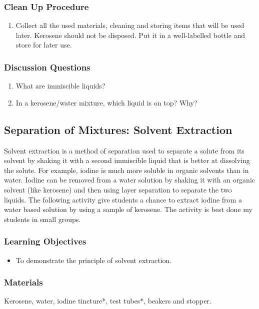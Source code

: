 \subsubsection*{Clean Up Procedure}
\begin{enumerate}
\item{Collect all the used materials, cleaning and storing items that will be used later. Kerosene should not be disposed. Put it in a well-labelled bottle and store for later use.}
\end{enumerate}

\subsubsection*{Discussion Questions}
\begin{enumerate}
\item{What are immiscible liquids?}
\item{In a kerosene/water mixture, which liquid is on top? Why?}
\end{enumerate}

\subsection{Separation of Mixtures: Solvent Extraction}

Solvent extraction is a method of separation used to separate a solute from its solvent by shaking it with a second immiscible liquid that is better at dissolving the solute. For example, iodine is much more soluble in organic solvents than in water. Iodine can be removed from a water solution by shaking it with an organic solvent (like kerosene) and then using layer separation to separate the two liquids.
The following activity give students a chance to extract iodine from a water based solution by using a sample of kerosene. The activity is best done my students in small groups.

\subsubsection*{Learning Objectives}
\begin{itemize}
\item{To demonstrate the principle of solvent extraction.}
\end{itemize}

\subsubsection*{Materials}
Kerosene, water, iodine tincture*, test tubes*, beakers and stopper.

